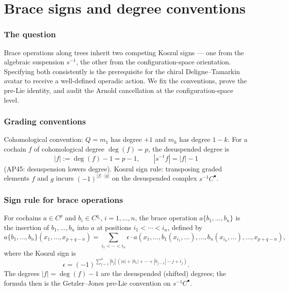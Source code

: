 \chapter{Brace signs and degree conventions}
\label{app:brace-signs}

\subsection*{The question}
Brace operations along trees inherit two competing Koszul signs --- one from the algebraic suspension $s^{-1}$, the other from the configuration-space orientation. Specifying both consistently is the prerequisite for the chiral Deligne--Tamarkin avatar to receive a well-defined operadic action. We fix the conventions, prove the pre-Lie identity, and audit the Arnold cancellation at the configuration-space level.

\subsection{Grading conventions}

Cohomological convention: $Q = m_1$ has degree $+1$ and $m_k$ has degree $1 - k$. For a cochain $f$ of cohomological degree $\deg(f) = p$, the desuspended degree is
\[
|f| := \deg(f) - 1 = p - 1,
\qquad
|s^{-1} f| = |f| - 1
\]
(AP45: desuspension lowers degree). Koszul sign rule: transposing graded elements $f$ and $g$ incurs $(-1)^{|f|\cdot|g|}$ on the desuspended complex $s^{-1} C^\bullet$.

\subsection{Sign rule for brace operations}

\begin{definition}
For cochains $a \in C^p$ and $b_i \in C^{q_i}$, $i = 1, \ldots, n$, the brace operation $a\{b_1, \ldots, b_n\}$ is the insertion of $b_1, \ldots, b_n$ into $a$ at positions $i_1 < \cdots < i_n$, defined by
\[
a\{b_1, \ldots, b_n\}(x_1, \ldots, x_{p+q-n}) = \sum_{i_1 < \cdots < i_n} \epsilon \cdot a(x_1, \ldots, b_1(x_{i_1}, \ldots), \ldots, b_n(x_{i_n}, \ldots), \ldots, x_{p+q-n}),
\]
where the Koszul sign is
\begin{equation}
\label{eq:brace-sign}
\epsilon = (-1)^{\sum_{j=1}^{n} |b_j|\,(|a| + |b_1| + \cdots + |b_{j-1}| - j + i_j)}.
\end{equation}
The degrees $|f| = \deg(f) - 1$ are the desuspended (shifted) degrees; the formula then is the Getzler--Jones \cite{GJ94} pre-Lie convention on $s^{-1} C^\bullet$.
\end{definition}

